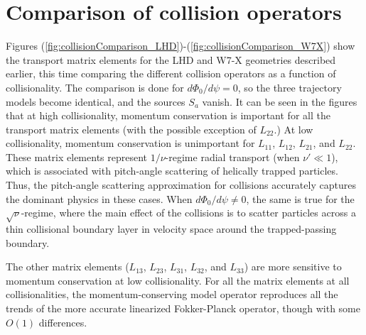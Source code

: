 \documentclass[12pt,superscriptaddress]{revtex4}
\begin{document}
\section{Comparison of collision operators}
\label{sec:collisionComparison}

Figures (\ref{fig:collisionComparison_LHD})-(\ref{fig:collisionComparison_W7X}) show the transport
matrix elements for the LHD and W7-X geometries described earlier, this time comparing
the different collision operators as a function of collisionality.
The comparison is done for $d\Phi_0/d\psi=0$, so the three trajectory models
become identical, and the sources $S_a$ vanish.
It can be seen in the figures that at high collisionality,
momentum conservation is important for all the transport matrix elements (with the possible exception of $L_{22}$.)
At low collisionality, momentum conservation 
is unimportant for $L_{11}$, $L_{12}$, $L_{21}$, and $L_{22}$.
These matrix elements represent $1/\nu$-regime radial transport
(when $\nu' \ll 1$), which is associated with pitch-angle scattering of helically trapped particles.
Thus, the pitch-angle scattering approximation for collisions accurately
captures the dominant physics in these cases. 
When $d\Phi_0/d\psi \ne 0$, the same is true for the
$\sqrt{\nu}$-regime, where the main effect of the collisions is to
scatter particles across a thin collisional boundary layer in velocity
space around the trapped-passing boundary.

The other matrix elements ($L_{13}$, $L_{23}$, $L_{31}$, $L_{32}$, and $L_{33}$) 
are more sensitive to momentum conservation at low collisionality.
For all the matrix elements at all collisionalities, the momentum-conserving model operator
reproduces all the trends of the more accurate linearized Fokker-Planck operator,
though with some $O(1)$ differences.
\end{document}
